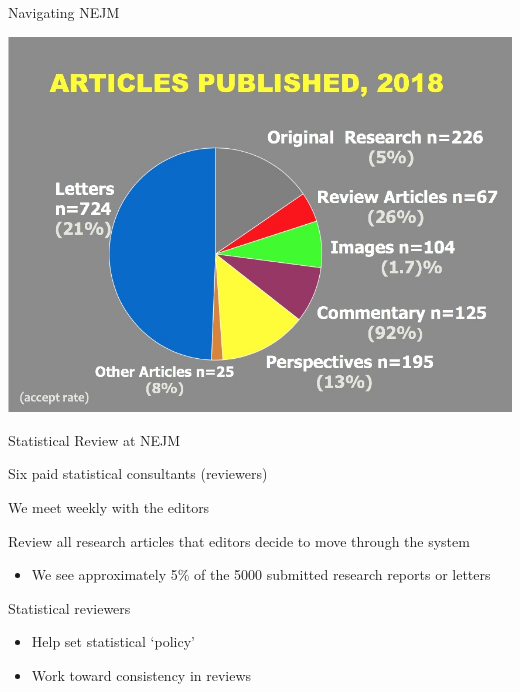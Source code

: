 \documentclass[ignorenonframetext,]{beamer}
\providecommand{\tightlist}{%
  \setlength{\itemsep}{0pt}\setlength{\parskip}{0pt}}
\begin{document}
\begin{frame}{Navigating NEJM}
\protect\hypertarget{navigating-nejm}{}

\centering

\includegraphics[width=1\textwidth,height=\textheight]{../figures/articles_published_2018.jpeg}

\end{frame}

\begin{frame}{Statistical Review at NEJM}
\protect\hypertarget{statistical-review-at-nejm}{}

Six paid statistical consultants (reviewers)

We meet weekly with the editors

Review all research articles that editors decide to move through the
system

\begin{itemize}
\tightlist
\item
  We see approximately 5\% of the 5000 submitted research reports or
  letters
\end{itemize}

Statistical reviewers

\begin{itemize}
\item
  Help set statistical `policy'
\item
  Work toward consistency in reviews
\end{itemize}

\end{frame}
\end{document}
